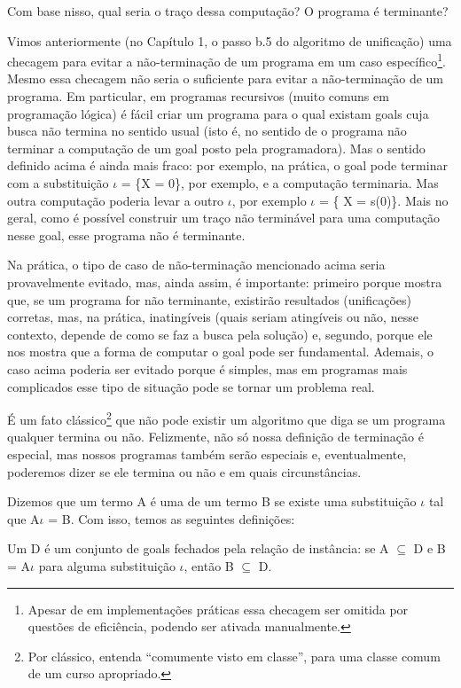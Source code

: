 Com base nisso, qual seria o traço dessa computação?
O programa é terminante?

Vimos anteriormente (no Capítulo 1, o passo b.5 do algoritmo de unificação) %
uma checagem para evitar a não-terminação de um programa em um caso específico\footnote{Apesar de em implementações práticas essa checagem ser omitida por questões de eficiência, podendo ser ativada manualmente.}.
Mesmo essa checagem não seria o suficiente para evitar a não-terminação de um programa.
Em particular, em programas recursivos (muito comuns em programação lógica) é fácil criar um programa para o qual existam goals cuja busca não termina no sentido usual (isto é, no sentido de o programa não terminar a computação de um goal posto pela programadora).
Mas o sentido definido acima é ainda mais fraco: por exemplo, na prática, o goal  pode terminar com a substituição $\iota$ = \{X = 0\}, por exemplo, e a computação terminaria. Mas outra computação poderia
levar a outro $\iota$, por exemplo $\iota$ = \{ X = s(0)\}. Mais no geral, como é possível construir um traço não terminável para uma computação nesse goal, esse programa não é terminante.

Na prática, o tipo de caso de não-terminação mencionado acima seria provavelmente evitado, mas, ainda assim, é importante: primeiro porque mostra que, se um programa for não terminante, existirão resultados (unificações) corretas, mas, na prática, inatingíveis (quais seriam atingíveis ou não, nesse contexto, depende de como se faz a busca pela solução) e, segundo, porque ele nos mostra que a forma de computar o goal pode ser fundamental. Ademais, o caso acima poderia ser evitado porque é simples, mas em programas mais complicados esse tipo de situação pode se tornar um problema real.

É um fato clássico\footnote{Por clássico, entenda ``comumente visto em classe'', para uma classe comum de um curso apropriado.} que não pode existir um algoritmo que diga se um programa qualquer termina ou não. Felizmente, não só nossa definição de terminação é especial, mas nossos programas também serão especiais e, eventualmente, poderemos dizer se ele termina ou não e em quais circunstâncias.

Dizemos que um termo A é uma  de um termo B se existe uma substituição $\iota$ tal que A$\iota$ = B. Com isso, temos as seguintes definições:

\begin{definition}
  Um  D é um conjunto de goals fechados pela relação de instância: se A $\subseteq$ D e B = A$\iota$ para alguma substituição $\iota$, então B $\subseteq$ D.
  \end{definition}

